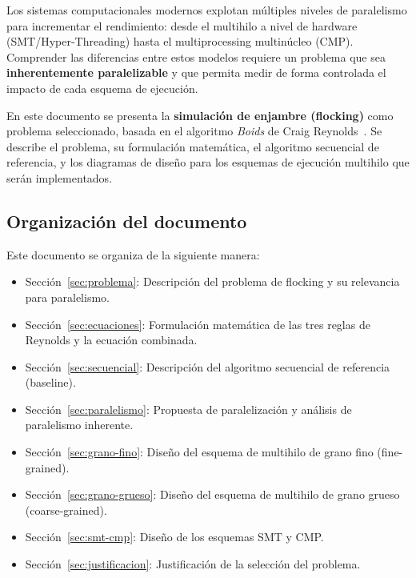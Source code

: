\documentclass[11pt,a4paper]{article}
\begin{document}
Los sistemas computacionales modernos explotan múltiples niveles de paralelismo para incrementar el rendimiento: desde el multihilo a nivel de hardware (SMT/Hyper-Threading) hasta el multiprocessing multinúcleo (CMP). Comprender las diferencias entre estos modelos requiere un problema que sea \textbf{inherentemente paralelizable} y que permita medir de forma controlada el impacto de cada esquema de ejecución.

En este documento se presenta la \textbf{simulación de enjambre (flocking)} como problema seleccionado, basada en el algoritmo \emph{Boids} de Craig Reynolds~\cite{reynolds1987}. Se describe el problema, su formulación matemática, el algoritmo secuencial de referencia, y los diagramas de diseño para los esquemas de ejecución multihilo que serán implementados.

\subsection{Organización del documento}

Este documento se organiza de la siguiente manera:
\begin{itemize}
  \item Sección~\ref{sec:problema}: Descripción del problema de flocking y su relevancia para paralelismo.
  \item Sección~\ref{sec:ecuaciones}: Formulación matemática de las tres reglas de Reynolds y la ecuación combinada.
  \item Sección~\ref{sec:secuencial}: Descripción del algoritmo secuencial de referencia (baseline).
  \item Sección~\ref{sec:paralelismo}: Propuesta de paralelización y análisis de paralelismo inherente.
  \item Sección~\ref{sec:grano-fino}: Diseño del esquema de multihilo de grano fino (fine-grained).
  \item Sección~\ref{sec:grano-grueso}: Diseño del esquema de multihilo de grano grueso (coarse-grained).
  \item Sección~\ref{sec:smt-cmp}: Diseño de los esquemas SMT y CMP.
  \item Sección~\ref{sec:justificacion}: Justificación de la selección del problema.
\end{itemize}

\end{document}

